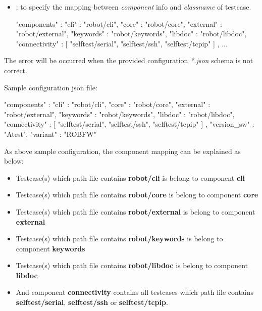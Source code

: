 \begin{itemize}
\begin{itemize}
\begin{itemize}
          \item
            : to specify the mapping between \emph{component} info
            and \emph{classname} of testcase.
\begin{robotcode}
  {
    "components" : {
      "cli"       : "robot/cli",
      "core"      : "robot/core",
      "external"  : "robot/external",
      "keywords"  : "robot/keywords",
      "libdoc"    : "robot/libdoc",
      "connectivity" : [
          "selftest/serial",
          "selftest/ssh",
          "selftest/tcpip"
      ]
    },
    ...
  }
\end{robotcode}
        \end{itemize}
        The error will be occurred when the provided configuration
        \emph{*.json} schema is not correct.
  \end{itemize}
\end{itemize}

Sample configuration json file:

\begin{pythoncode}
{
   "components" : {
                  "cli"       : "robot/cli",
                  "core"      : "robot/core",
                  "external"  : "robot/external",
                  "keywords"  : "robot/keywords",
                  "libdoc"    : "robot/libdoc",
                  "connectivity" : [
                      "selftest/serial",
                      "selftest/ssh",
                      "selftest/tcpip"
                  ]
   },
   "version_sw" : "Atest",
   "variant"    : "ROBFW"
}
\end{pythoncode}

As above sample configuration, the component mapping can be explained as below:

\begin{itemize}
  \item Testcase(s) which path file contains \textbf{robot/cli} is belong to component \textbf{cli}
  \item Testcase(s) which path file contains \textbf{robot/core} is belong to component \textbf{core}
  \item Testcase(s) which path file contains \textbf{robot/external} is belong to component \textbf{external}
  \item Testcase(s) which path file contains \textbf{robot/keywords} is belong to component \textbf{keywords}
  \item Testcase(s) which path file contains \textbf{robot/libdoc} is belong to component \textbf{libdoc}
  \item And component \textbf{connectivity} contains all testcases which path file contains
        \textbf{selftest/serial}, \textbf{selftest/ssh} or \textbf{selftest/tcpip}.
\end{itemize}


